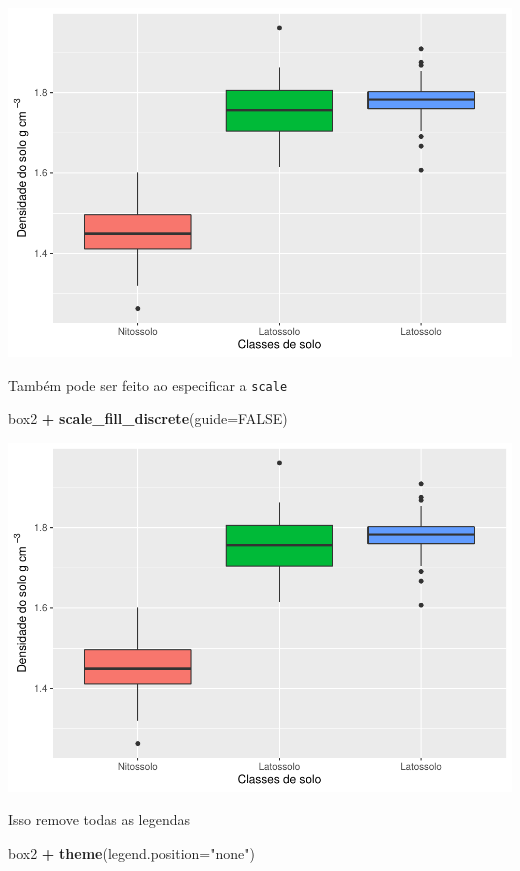 \documentclass[
]{book}
\newenvironment{Shaded}{\begin{snugshade}}{\end{snugshade}}
\newcommand{\DataTypeTok}[1]{\textcolor[rgb]{0.13,0.29,0.53}{#1}}
\newcommand{\KeywordTok}[1]{\textcolor[rgb]{0.13,0.29,0.53}{\textbf{#1}}}
\newcommand{\NormalTok}[1]{#1}
\newcommand{\OperatorTok}[1]{\textcolor[rgb]{0.81,0.36,0.00}{\textbf{#1}}}
\newcommand{\OtherTok}[1]{\textcolor[rgb]{0.56,0.35,0.01}{#1}}
\newcommand{\StringTok}[1]{\textcolor[rgb]{0.31,0.60,0.02}{#1}}
\begin{document}
\includegraphics{TudodoR_files/figure-latex/unnamed-chunk-208-1.pdf}

Também pode ser feito ao especificar a \texttt{scale}

\begin{Shaded}
\begin{Highlighting}[]
\NormalTok{box2 }\OperatorTok{+}\StringTok{ }\KeywordTok{scale_fill_discrete}\NormalTok{(}\DataTypeTok{guide=}\OtherTok{FALSE}\NormalTok{)}
\end{Highlighting}
\end{Shaded}

\includegraphics{TudodoR_files/figure-latex/unnamed-chunk-209-1.pdf}

Isso remove todas as legendas

\begin{Shaded}
\begin{Highlighting}[]
\NormalTok{box2 }\OperatorTok{+}\StringTok{ }\KeywordTok{theme}\NormalTok{(}\DataTypeTok{legend.position=}\StringTok{"none"}\NormalTok{)}
\end{Highlighting}
\end{Shaded}
\end{document}
